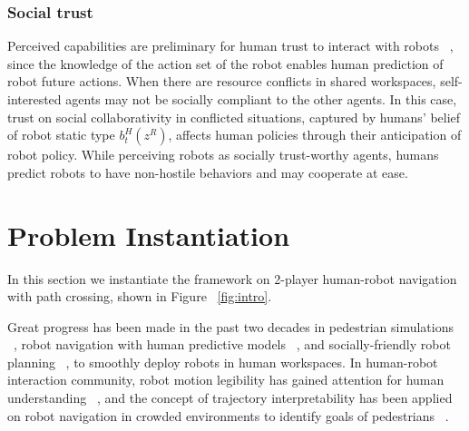 \documentclass[letterpaper, 10 pt, conference]{ieeeconf}  %
\begin{document}
\subsubsection{Social trust}%
Perceived capabilities are preliminary for human trust to interact with robots ~\cite{yang2017evaluating}, since the knowledge of the action set of the robot enables 
human prediction of robot future actions. When there are resource conflicts in shared workspaces, self-interested agents may not be socially compliant to the other agents. 
In this case, trust on social collaborativity in conflicted situations, captured by humans' belief of robot static type $b^H_t(z^R)$, affects human policies through their anticipation of robot policy. While perceiving robots as socially trust-worthy agents, humans predict robots to have non-hostile behaviors and may cooperate at ease.   


\section{Problem Instantiation}
In this section we instantiate the framework on 2-player human-robot navigation with path 
crossing, shown in Figure ~\ref{fig:intro}.


Great progress has been made in the past two decades in pedestrian simulations ~\cite{karamouzas2009predictive,zanlungo2011social}, robot navigation with human predictive models ~\cite{trautman2010unfreezing,kuderer2012feature}, and socially-friendly robot planning ~\cite{mavrogiannis2016decentralized,chen2017socially}, to smoothly deploy robots in human workspaces. In human-robot interaction community, robot motion legibility has gained attention for human understanding ~\cite{dragan2013legibility}, and the concept of trajectory interpretability has been applied on robot navigation in crowded environments to identify goals of pedestrians ~\cite{bai2015intention,unhelkar2015human}. 
\end{document}
